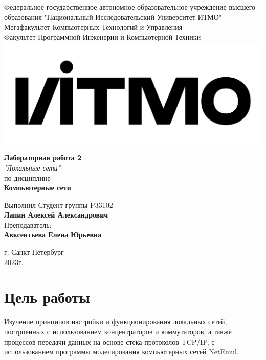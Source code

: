 \documentclass[12pt,onecolumn]{article}
\begin{document}
\setcounter{tocdepth}{4}
\begin{center}
    Федеральное государственное автономное образовательное учреждение высшего образования "Национальный Исследовательский Университет ИТМО"\\ 
    Мегафакультет Компьютерных Технологий и Управления\\
    Факультет Программной Инженерии и Компьютерной Техники \\
    \includegraphics[scale=0.3]{image/itmo.jpg} %
\end{center}
\vspace{1cm}


\begin{center}
    \textbf{Лабораторная работа 2}\\
    \textit{"Локальные сети"}\\
    по дисциплине\\
    \textbf{Компьютерные сети}
\end{center}

\vspace{2cm}

\begin{flushright}
  Выполнил Студент  группы P33102\\
  \textbf{Лапин Алексей Александрович}\\
  Преподаватель: \\
  \textbf{Авксентьева Елена Юрьевна}\\
\end{flushright}

\vspace{6cm}
\begin{center}
    г. Санкт-Петербург\\
    2023г.
\end{center}

\newpage
\tableofcontents
\newpage

\section*{Цель работы}
Изучение принципов настройки и функционирования локальных сетей, построенных с использованием концентраторов и коммутаторов, а также процессов передачи данных на основе стека протоколов TCP/IP, с использованием программы моделирования компьютерных сетей NetEmul.
\end{document}
